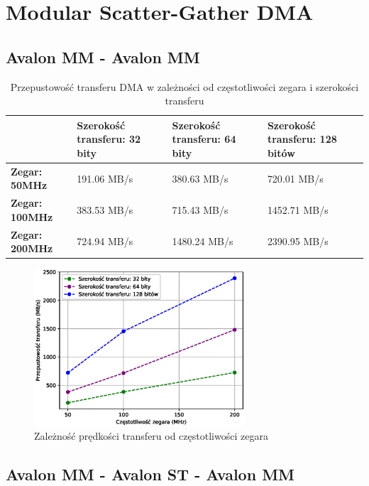 \chapter{Modular Scatter-Gather DMA}

\section{Avalon MM - Avalon MM}

\begin{table}[h]
    \centering
    \renewcommand{\arraystretch}{1.2}
    \begin{tabular}{|l|p{3cm}|p{3cm}|p{3cm}|}
    \hline
     & \textbf{Szerokość transferu: 32 bity} & \textbf{Szerokość transferu: 64 bity} & \textbf{Szerokość transferu: 128 bitów} \\ \hline
    \textbf{Zegar: 50MHz} & {191.06 MB/s} & {380.63 MB/s} & {720.01 MB/s} \\ \hline
    \textbf{Zegar: 100MHz} & {383.53 MB/s} & {715.43 MB/s} & {1452.71 MB/s} \\ \hline
    \textbf{Zegar: 200MHz} & {724.94 MB/s} & {1480.24 MB/s}  & {2390.95 MB/s} \\ \hline
    \end{tabular}
    \caption{Przepustowość transferu DMA w zależności od częstotliwości zegara i szerokości transferu}
    \label{tab:mm_mm}
\end{table}

\begin{figure}[h]
    \centering
    \includegraphics[width=0.7\textwidth]{mm_mm.eps}
    \caption{Zależność prędkości transferu od częstotliwości zegara}
    \label{fig:mm_mm}
\end{figure}

\section{Avalon MM - Avalon ST - Avalon MM}

